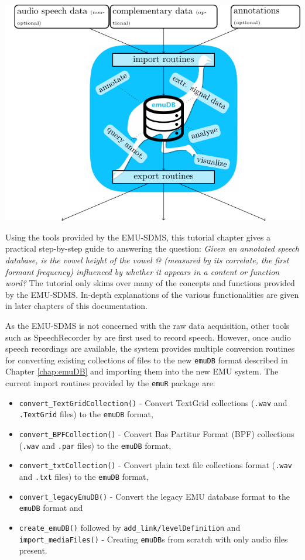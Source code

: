 \documentclass[]{book}
\providecommand{\tightlist}{%
  \setlength{\itemsep}{0pt}\setlength{\parskip}{0pt}}
\theoremstyle{definition}
\theoremstyle{definition}
\theoremstyle{definition}
\theoremstyle{remark}
\begin{document}
\begin{center}\includegraphics[width=0.65\linewidth]{pics/emuSdmsBirdsEye} \end{center}

Using the tools provided by the EMU-SDMS, this tutorial chapter gives a
practical step-by-step guide to answering the question: \emph{Given an
annotated speech database, is the vowel height of the vowel @ (measured
by its correlate, the first formant frequency) influenced by whether it
appears in a content or function word?} The tutorial only skims over
many of the concepts and functions provided by the EMU-SDMS. In-depth
explanations of the various functionalities are given in later chapters
of this documentation.

As the EMU-SDMS is not concerned with the raw data acquisition, other
tools such as SpeechRecorder by \citet{draxler:2004a} are first used to
record speech. However, once audio speech recordings are available, the
system provides multiple conversion routines for converting existing
collections of files to the new \texttt{emuDB} format described in
Chapter \ref{chap:emuDB} and importing them into the new EMU system. The
current import routines provided by the \texttt{emuR} package are:

\begin{itemize}
\tightlist
\item
  \texttt{convert\_TextGridCollection()} - Convert TextGrid collections
  (\texttt{.wav} and \texttt{.TextGrid} files) to the \texttt{emuDB}
  format,
\item
  \texttt{convert\_BPFCollection()} - Convert Bas Partitur Format (BPF)
  collections (\texttt{.wav} and \texttt{.par} files) to the
  \texttt{emuDB} format,
\item
  \texttt{convert\_txtCollection()} - Convert plain text file
  collections format (\texttt{.wav} and \texttt{.txt} files) to the
  \texttt{emuDB} format,
\item
  \texttt{convert\_legacyEmuDB()} - Convert the legacy EMU database
  format to the \texttt{emuDB} format and
\item
  \texttt{create\_emuDB()} followed by
  \texttt{add\_link/levelDefinition} and \texttt{import\_mediaFiles()} -
  Creating \texttt{emuDB}s from scratch with only audio files present.
\end{itemize}
\end{document}
